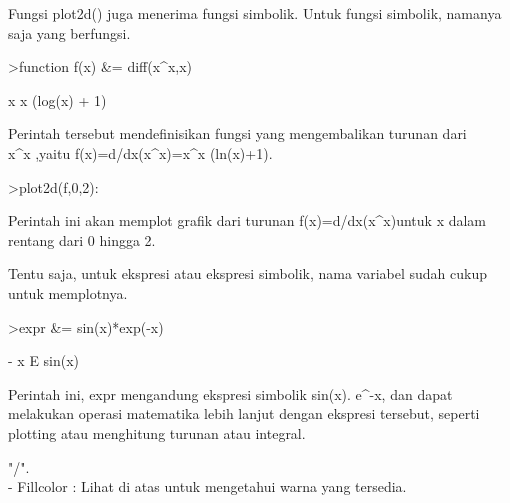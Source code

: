 \documentclass{article}
\begin{document}
\begin{eulernotebook}
\begin{eulercomment}
\begin{eulercomment}
\begin{eulercomment}
\begin{eulercomment}
\begin{eulercomment}
\begin{eulercomment}
\begin{eulercomment}
Fungsi plot2d() juga menerima fungsi simbolik. Untuk fungsi simbolik,
namanya saja yang berfungsi.
\end{eulercomment}
\begin{eulerprompt}
>function f(x) &= diff(x^x,x)
\end{eulerprompt}
\begin{euleroutput}
  
                              x
                             x  (log(x) + 1)
  
\end{euleroutput}
\begin{eulercomment}
Perintah tersebut mendefinisikan fungsi yang mengembalikan turunan
dari\\
x\textasciicircum{}x ,yaitu f(x)=d/dx(x\textasciicircum{}x)=x\textasciicircum{}x (ln(x)+1).
\end{eulercomment}
\begin{eulerprompt}
>plot2d(f,0,2):
\end{eulerprompt}
\begin{eulercomment}
Perintah ini akan memplot grafik dari turunan f(x)=d/dx(x\textasciicircum{}x)untuk x
dalam rentang dari 0 hingga 2.

Tentu saja, untuk ekspresi atau ekspresi simbolik, nama variabel sudah
cukup untuk memplotnya.
\end{eulercomment}
\begin{eulerprompt}
>expr &= sin(x)*exp(-x)
\end{eulerprompt}
\begin{euleroutput}
  
                                - x
                               E    sin(x)
  
\end{euleroutput}
\begin{eulercomment}
Perintah ini, expr mengandung ekspresi simbolik sin(x). e\textasciicircum{}-x, dan
dapat melakukan operasi matematika lebih lanjut dengan ekspresi
tersebut, seperti plotting atau menghitung turunan atau integral.

"/".\\
- Fillcolor : Lihat di atas untuk mengetahui warna yang tersedia.


\end{eulercomment}
\end{eulercomment}
\end{eulercomment}
\end{eulercomment}
\end{eulercomment}
\end{eulercomment}
\end{eulercomment}
\end{eulernotebook}
\end{document}
